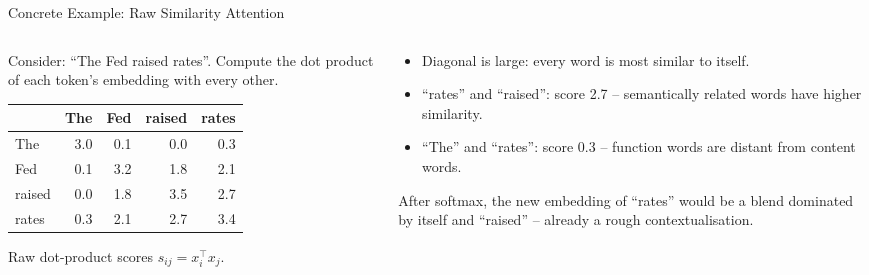 \documentclass[aspectratio=169]{beamer}
\begin{document}
%
%
\begin{frame}{Concrete Example: Raw Similarity Attention}
  \begin{columns}[t]
    \begin{column}{0.52\textwidth}
      Consider: ``The Fed raised rates''. Compute the dot product of each token's
      embedding with every other.

      \vspace{0.5em}
      \begin{center}
      {\small
      \begin{tabular}{lrrrr}
        \toprule
               & The  & Fed  & raised & rates \\
        \midrule
        The    & 3.0  & 0.1  & 0.0    & 0.3   \\
        Fed    & 0.1  & 3.2  & 1.8    & 2.1   \\
        raised & 0.0  & 1.8  & 3.5    & 2.7   \\
        rates  & 0.3  & 2.1  & 2.7    & 3.4   \\
        \bottomrule
      \end{tabular}}
      \end{center}
      {\small Raw dot-product scores $s_{ij} = x_i^\top x_j$.}
    \end{column}
    \begin{column}{0.44\textwidth}
      \begin{itemize}
        \item Diagonal is large: every word is most similar to itself.
        \item ``rates'' and ``raised'': score 2.7 – semantically related words have
              higher similarity.
        \item ``The'' and ``rates'': score 0.3 – function words are distant from
              content words.
      \end{itemize}
      \vspace{0.4em}
      After softmax, the new embedding of ``rates'' would be a blend dominated by
      itself and ``raised'' – already a rough contextualisation.
    \end{column}
  \end{columns}
\end{frame}
%
%
\end{document}
